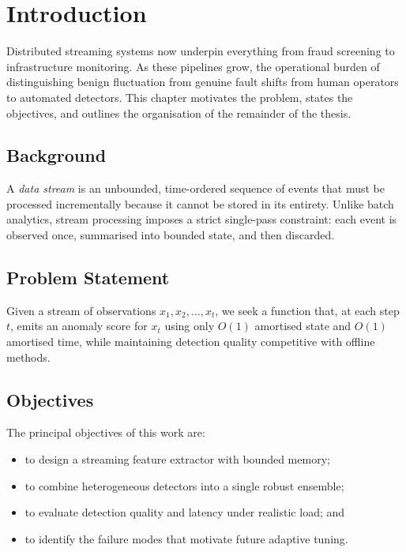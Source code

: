 \documentclass[12pt,a4paper,oneside]{report}
\begin{document}
\chapter{Introduction}
\label{ch:introduction}

Distributed streaming systems now underpin everything from fraud screening to
infrastructure monitoring. As these pipelines grow, the operational burden of
distinguishing benign fluctuation from genuine fault shifts from human
operators to automated detectors. This chapter motivates the problem, states
the objectives, and outlines the organisation of the remainder of the thesis.

\section{Background}
\label{sec:background}
A \emph{data stream} is an unbounded, time-ordered sequence of events that must
be processed incrementally because it cannot be stored in its entirety. Unlike
batch analytics, stream processing imposes a strict single-pass constraint:
each event is observed once, summarised into bounded state, and then discarded.

\section{Problem Statement}
\label{sec:problem}
Given a stream of observations $x_1, x_2, \dots, x_t$, we seek a function that,
at each step $t$, emits an anomaly score for $x_t$ using only $O(1)$ amortised
state and $O(1)$ amortised time, while maintaining detection quality
competitive with offline methods.

\section{Objectives}
\label{sec:objectives}
The principal objectives of this work are:
\begin{itemize}[leftmargin=2em]
  \item to design a streaming feature extractor with bounded memory;
  \item to combine heterogeneous detectors into a single robust ensemble;
  \item to evaluate detection quality and latency under realistic load; and
  \item to identify the failure modes that motivate future adaptive tuning.
\end{itemize}
\end{document}
